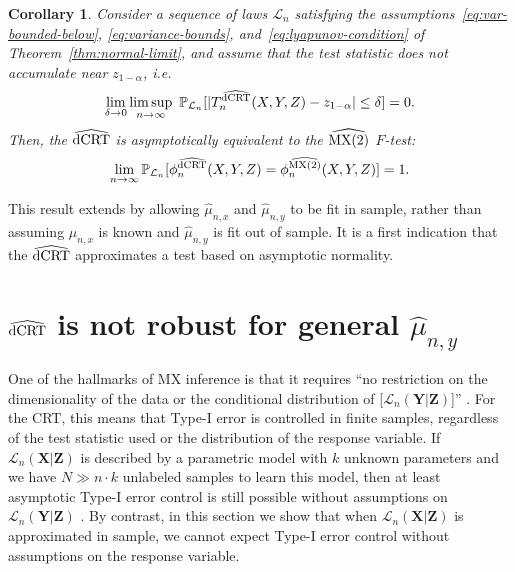 \documentclass[12pt]{article}
\newtheorem{corollary}{Corollary}
\theoremstyle{definition}
\theoremstyle{remark}
\newcommand\linktoproof[1]{ {\normalfont[{\hyperlink{#1}{Proof}}]} }
\renewcommand{\P}{\mathbb{P}}							%
\newcommand{\prx}{\bm X}								%
\newcommand{\srx}{X}									%
\newcommand{\prz}{\bm Z}								%
\newcommand{\srz}{Z}									%
\newcommand{\pry}{{\bm Y}}								%
\newcommand{\sry}{Y}									%
\newcommand{\law}{\mathcal L}							%
\newcommand{\dCRThat}{\widehat{\textnormal{dCRT}}}		%
\newcommand{\MXtwohat}{\widehat{\textnormal{MX(2)}}}		%
\begin{document}
	\begin{corollary} \label{cor:asymptotic-equivalence} \linktoproof{proof:thm:normal-limit}
		Consider a sequence of laws $\law_n$ satisfying the assumptions~\eqref{eq:var-bounded-below}, \eqref{eq:variance-bounds}, and~\eqref{eq:lyapunov-condition} of Theorem~\ref{thm:normal-limit}, and assume that the test statistic does not accumulate near $z_{1-\alpha}$, i.e.
		\begin{equation}
			\lim_{\delta \rightarrow 0}\limsup_{n \rightarrow \infty}\ \P_{\law_n}[|T_n^{\dCRThat}(\srx, \sry, \srz)-z_{1-\alpha}| \leq \delta] = 0.
			\label{eq:non-accumulation}
		\end{equation}
		Then, the $\dCRThat$ is asymptotically equivalent to the $\MXtwohat$ $F$-test:
		\begin{equation}
			\lim_{n \rightarrow \infty}\P_{\law_n}[\phi_n^{\dCRThat}(\srx, \sry, \srz) = \phi_n^{\MXtwohat}(\srx, \sry, \srz)] = 1.
		\end{equation}
		
	\end{corollary}

	This result extends \citet[Theorem 2]{Katsevich2020a} by allowing $\widehat \mu_{n,x}$ and $\widehat \mu_{n,y}$ to be fit in sample, rather than assuming $\mu_{n,x}$ is known and $\widehat \mu_{n,y}$ is fit out of sample. It is a first indication that the $\dCRThat$ approximates a test based on asymptotic normality.
	
	
	\section{$\dCRThat$ is not robust for general $\widehat \mu_{n,y}$} \label{sec:neg-results}
	
	One of the hallmarks of MX inference is that it requires ``no restriction on the dimensionality of the data or the conditional distribution of [$\law_n(\pry|\prz)$]'' \citep{CetL16}. For the CRT, this means that Type-I error is controlled in finite samples, regardless of the test statistic used or the distribution of the response variable. If $\law_n(\prx|\prz)$ is described by a parametric model with $k$ unknown parameters and we have $N \gg n \cdot k$ unlabeled samples to learn this model, then at least asymptotic Type-I error control is still possible without assumptions on $\law_n(\pry|\prz)$ \citep{Berrett2019}. By contrast, in this section we show that when $\law_n(\prx|\prz)$ is approximated in sample, we cannot expect Type-I error control without assumptions on the response variable.
	
\end{document}
